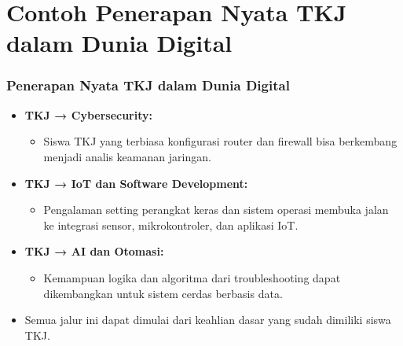 \documentclass[aspectratio=169, table]{beamer}
\begin{document}
\section{Contoh Penerapan Nyata TKJ dalam Dunia Digital}
\begin{frame}
	\frametitle{Penerapan Nyata TKJ dalam Dunia Digital}
	\vspace{10pt}
	\begin{itemize}
		\item \textbf{TKJ → Cybersecurity:}
		\begin{itemize}
			\item Siswa TKJ yang terbiasa konfigurasi router dan firewall bisa berkembang menjadi analis keamanan jaringan.
		\end{itemize}
		\item \textbf{TKJ → IoT dan Software Development:}
		\begin{itemize}
			\item Pengalaman setting perangkat keras dan sistem operasi membuka jalan ke integrasi sensor, mikrokontroler, dan aplikasi IoT.
		\end{itemize}
		\item \textbf{TKJ → AI dan Otomasi:}
		\begin{itemize}
			\item Kemampuan logika dan algoritma dari troubleshooting dapat dikembangkan untuk sistem cerdas berbasis data.
		\end{itemize}
		\item Semua jalur ini dapat dimulai dari keahlian dasar yang sudah dimiliki siswa TKJ.
	\end{itemize}
\end{frame}

\end{document}

